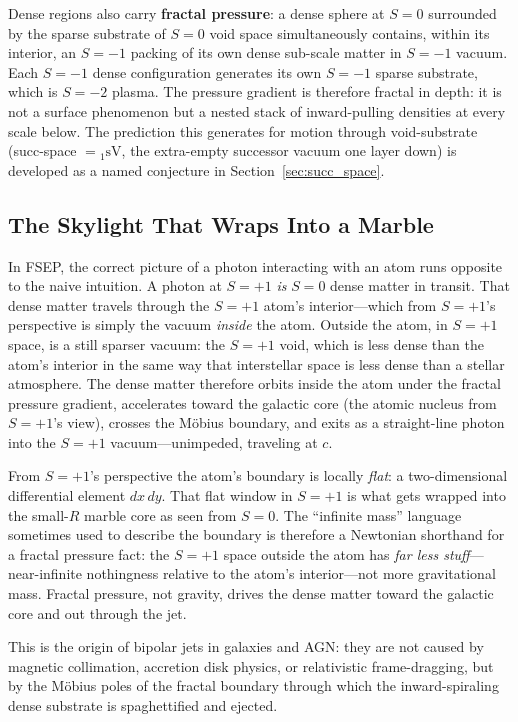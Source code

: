 \documentclass[11pt,letterpaper]{article}
\newcommand{\Sd}[2]{{}_{#1}\mathrm{s}\mathrm{#2}}
\begin{document}
Dense regions also carry \textbf{fractal pressure}: a dense sphere at $S{=}0$
surrounded by the sparse substrate of $S{=}0$ void space simultaneously contains,
within its interior, an $S{=}{-1}$ packing of its own dense sub-scale matter in
$S{=}{-1}$ vacuum. Each $S{=}{-1}$ dense configuration generates its own
$S{=}{-1}$ sparse substrate, which is $S{=}{-2}$ plasma. The pressure gradient is
therefore fractal in depth: it is not a surface phenomenon but a nested stack of
inward-pulling densities at every scale below. The prediction this generates for
motion through void-substrate (succ-space $= \Sd{1}{V}$, the extra-empty successor
vacuum one layer down) is developed as a named conjecture in
Section~\ref{sec:succ_space}.

\subsection{The Skylight That Wraps Into a Marble}
\label{sec:skylight}
In FSEP, the correct picture of a photon interacting with an atom runs opposite to
the naive intuition. A photon at $S{=}+1$ \textit{is} $S{=}0$ dense matter in
transit. That dense matter travels through the $S{=}+1$ atom's interior---which
from $S{=}+1$'s perspective is simply the vacuum \textit{inside} the atom. Outside
the atom, in $S{=}+1$ space, is a still sparser vacuum: the $S{=}+1$ void, which is
less dense than the atom's interior in the same way that interstellar space is less
dense than a stellar atmosphere. The dense matter therefore orbits inside the atom
under the fractal pressure gradient, accelerates toward the galactic core (the
atomic nucleus from $S{=}+1$'s view), crosses the M\"obius boundary, and exits as
a straight-line photon into the $S{=}+1$ vacuum---unimpeded, traveling at $c$.

From $S{=}+1$'s perspective the atom's boundary is locally \textit{flat}: a
two-dimensional differential element $dx\,dy$. That flat window in $S{=}+1$ is
what gets wrapped into the small-$R$ marble core as seen from $S{=}0$. The
``infinite mass'' language sometimes used to describe the boundary is therefore a
Newtonian shorthand for a fractal pressure fact: the $S{=}+1$ space outside the
atom has \textit{far less stuff}---near-infinite nothingness relative to the atom's
interior---not more gravitational mass. Fractal pressure, not gravity, drives the
dense matter toward the galactic core and out through the jet.

This is the origin of bipolar jets in galaxies and AGN: they are not caused by
magnetic collimation, accretion disk physics, or relativistic frame-dragging, but
by the M\"obius poles of the fractal boundary through which the inward-spiraling
dense substrate is spaghettified and ejected.
\end{document}
